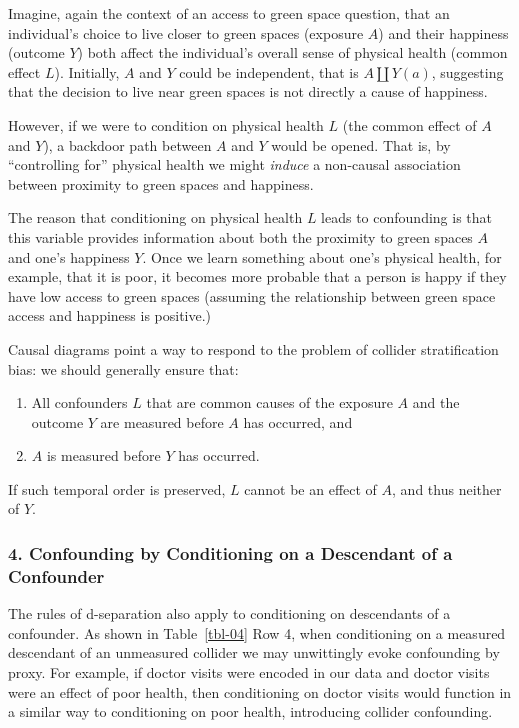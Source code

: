 \documentclass[
  singlecolumn]{article}
\begin{document}
Imagine, again the context of an access to green space question, that an
individual's choice to live closer to green spaces (exposure \(A\)) and
their happiness (outcome \(Y\)) both affect the individual's overall
sense of physical health (common effect \(L\)). Initially, \(A\) and
\(Y\) could be independent, that is \(A \coprod Y(a)\), suggesting that
the decision to live near green spaces is not directly a cause of
happiness.

However, if we were to condition on physical health \(L\) (the common
effect of \(A\) and \(Y\)), a backdoor path between \(A\) and \(Y\)
would be opened. That is, by ``controlling for'' physical health we
might \emph{induce} a non-causal association between proximity to green
spaces and happiness.

The reason that conditioning on physical health \(L\) leads to
confounding is that this variable provides information about both the
proximity to green spaces \(A\) and one's happiness \(Y\). Once we learn
something about one's physical health, for example, that it is poor, it
becomes more probable that a person is happy if they have low access to
green spaces (assuming the relationship between green space access and
happiness is positive.)

Causal diagrams point a way to respond to the problem of collider
stratification bias: we should generally ensure that:

\begin{enumerate}
\def\labelenumi{\arabic{enumi}.}
\item
  All confounders \(L\) that are common causes of the exposure \(A\) and
  the outcome \(Y\) are measured before \(A\) has occurred, and
\item
  \(A\) is measured before \(Y\) has occurred.
\end{enumerate}

If such temporal order is preserved, \(L\) cannot be an effect of \(A\),
and thus neither of \(Y\).

\subsubsection{4. Confounding by Conditioning on a Descendant of a
Confounder}\label{confounding-by-conditioning-on-a-descendant-of-a-confounder}

The rules of d-separation also apply to conditioning on descendants of a
confounder. As shown in Table~\ref{tbl-04} Row 4, when conditioning on a
measured descendant of an unmeasured collider we may unwittingly evoke
confounding by proxy. For example, if doctor visits were encoded in our
data and doctor visits were an effect of poor health, then conditioning
on doctor visits would function in a similar way to conditioning on poor
health, introducing collider confounding.
\end{document}
